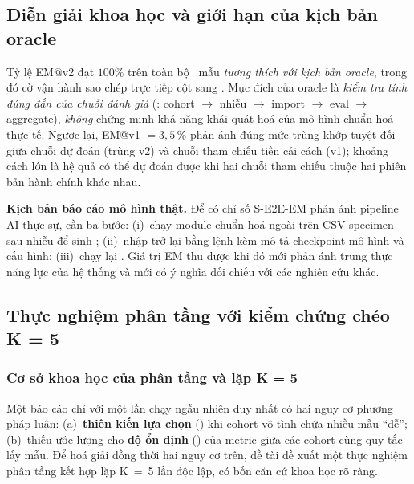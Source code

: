 \subsection{Diễn giải khoa học và giới hạn của kịch bản oracle}
\label{sec:exp-supa-oracle}

Tỷ lệ EM@v2 đạt \(100\%\) trên toàn bộ \VNASUPANRequested\, mẫu \emph{tương thích với kịch bản oracle}, trong đó cờ vận hành  sao chép trực tiếp cột  sang . Mục đích của oracle là \emph{kiểm tra tính đúng đắn của chuỗi đánh giá} (: cohort \(\to\) nhiễu \(\to\) import \(\to\) eval \(\to\) aggregate), \emph{không} chứng minh khả năng khái quát hoá của mô hình chuẩn hoá thực tế. Ngược lại, EM@v1 \(= 3{,}5\,\%\) phản ánh đúng mức trùng khớp tuyệt đối giữa chuỗi dự đoán (trùng v2) và chuỗi tham chiếu tiền cải cách (v1); khoảng cách lớn là hệ quả có thể dự đoán được khi hai chuỗi tham chiếu thuộc hai phiên bản hành chính khác nhau.

\textbf{Kịch bản báo cáo mô hình thật.} Để có chỉ số S-E2E-EM phản ánh pipeline AI thực sự, cần ba bước: (i)~chạy module chuẩn hoá ngoài trên CSV specimen sau nhiễu để sinh ; (ii)~nhập trở lại bằng lệnh  kèm  mô tả checkpoint mô hình và cấu hình; (iii)~chạy lại . Giá trị EM thu được khi đó mới phản ánh trung thực năng lực của hệ thống và mới có ý nghĩa đối chiếu với các nghiên cứu khác.

\subsection{Thực nghiệm phân tầng với kiểm chứng chéo K = 5}
\label{sec:exp-supa-stratified}

\subsubsection{Cơ sở khoa học của phân tầng và lặp K = 5}
\label{sec:exp-supa-rationale}

Một báo cáo chỉ với một lần chạy ngẫu nhiên duy nhất có hai nguy cơ phương pháp luận: (a)~\textbf{thiên kiến lựa chọn} () khi cohort vô tình chứa nhiều mẫu ``dễ''; (b)~thiếu ước lượng cho \textbf{độ ổn định} () của metric giữa các cohort cùng quy tắc lấy mẫu. Để hoá giải đồng thời hai nguy cơ trên, đề tài đề xuất một thực nghiệm phân tầng kết hợp lặp K~=~5 lần độc lập, có bốn căn cứ khoa học rõ ràng.

